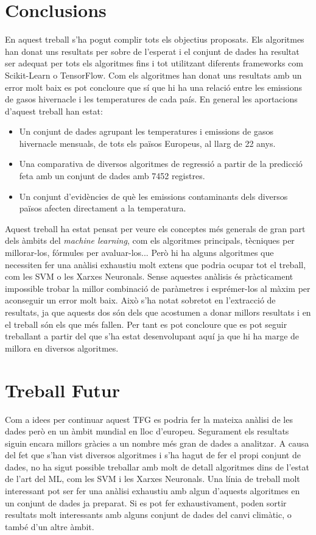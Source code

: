 \documentclass[10pt,a4paper,twocolumn,twoside]{article}
\begin{document}
\section {Conclusions}
En aquest treball s'ha pogut complir tots els objectius proposats. Els algoritmes han donat uns resultats per sobre de l'esperat i el conjunt de dades ha resultat ser adequat per tots els algoritmes fins i tot utilitzant diferents frameworks com Scikit-Learn o TensorFlow. Com els algoritmes han donat uns resultats amb un error molt baix es pot concloure que sí que hi ha una relació entre les emissions de gasos hivernacle i les temperatures de cada país. En general les aportacions d'aquest treball han estat:
\begin{itemize}
\item Un conjunt de dades agrupant les temperatures i emissions de gasos hivernacle mensuals, de tots els països Europeus, al llarg de 22 anys.
\item Una comparativa de diversos algoritmes de regressió a partir de la predicció feta amb un conjunt de dades amb 7452 registres.
\item Un conjunt d'evidències de què les emissions contaminants dels diversos països afecten directament a la temperatura.
\end{itemize}
Aquest treball ha estat pensat per veure els conceptes més generals de gran part dels àmbits del \textit{machine learning}, com els algoritmes principals, tècniques per millorar-los, fórmules per avaluar-los... Però hi ha alguns algoritmes que necessiten fer una anàlisi exhaustiu molt extens que podria ocupar tot el treball, com les SVM o les Xarxes Neuronals. Sense aquestes anàlisis és pràcticament impossible trobar la millor combinació de paràmetres i esprémer-los al màxim per aconseguir un error molt baix. Això s'ha notat sobretot en l'extracció de resultats, ja que aquests dos són dels que acostumen a donar millors resultats i en el treball són els que més fallen. Per tant es pot concloure que es pot seguir treballant a partir del que s'ha estat desenvolupant aquí ja que hi ha marge de millora en diversos algoritmes.

\section{Treball Futur}
Com a idees per continuar aquest TFG es podria fer la mateixa anàlisi de les dades però en un àmbit mundial en lloc d'europeu. Segurament els resultats siguin encara millors gràcies a un nombre més gran de dades a analitzar. A causa del fet que s'han vist diversos algoritmes i s'ha hagut de fer el propi conjunt de dades, no ha sigut possible treballar amb molt de detall algoritmes dins de l'estat de l'art del ML, com les SVM i les Xarxes Neuronals. Una línia de treball molt interessant pot ser fer una anàlisi exhaustiu amb algun d'aquests algoritmes en un conjunt de dades ja preparat. Si es pot fer exhaustivament, poden sortir resultats molt interessants amb alguns conjunt de dades del canvi climàtic, o també d'un altre àmbit.
\end{document}
